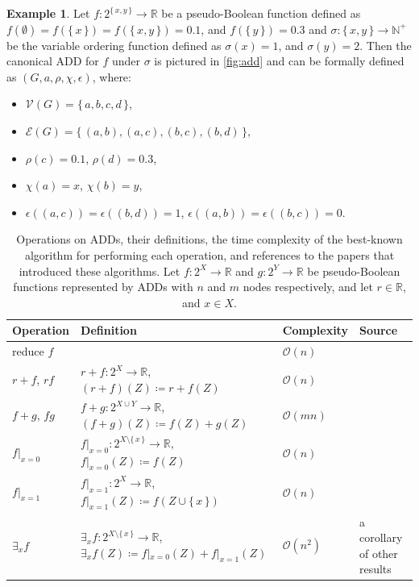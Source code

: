 \documentclass{article}
\theoremstyle{definition}
\newtheorem{example}{Example}
\theoremstyle{remark}
\begin{document}
\begin{example} \label{example:add}
  Let $f\colon 2^{\{\,x, y\,\}} \to \mathbb{R}$ be a pseudo-Boolean function
  defined as $f(\emptyset) = f(\{\,x\,\}) = f(\{\,x, y\,\}) = 0.1$, and
  $f(\{\,y\,\}) = 0.3$ and $\sigma\colon \{\,x, y\,\} \to \mathbb{N}^+$ be
  the variable ordering function defined as $\sigma(x) = 1$, and $\sigma(y) =
  2$. Then the canonical ADD for $f$ under $\sigma$ is pictured in
  \cref{fig:add} and can be formally defined as $(G, a, \rho, \chi, \epsilon)$,
  where:
  \begin{itemize}
  \item $\mathcal{V}(G) = \{\,a, b, c, d\,\}$,
  \item $\mathcal{E}(G) = \{\,(a, b), (a, c), (b, c), (b, d)\,\}$,
  \item $\rho(c) = 0.1$, $\rho(d) = 0.3$,
  \item $\chi(a) = x$, $\chi(b) = y$,
  \item $\epsilon((a, c)) = \epsilon((b, d)) = 1$, $\epsilon((a, b)) =
    \epsilon((b, c)) = 0$.
  \end{itemize}
\end{example}

\begin{table}
  \centering
  \caption{Operations on ADDs, their definitions, the time complexity of the
    best-known algorithm for performing each operation, and references to the
    papers that introduced these algorithms. Let $f\colon 2^X \to \mathbb{R}$
    and $g\colon 2^Y \to \mathbb{R}$ be pseudo-Boolean functions represented by
    ADDs with $n$ and $m$ nodes respectively, and let $r \in \mathbb{R}$, and $x
    \in X$.}
  \label{tbl:complexity}
  \begin{tabular}{llll}
    \toprule
    Operation & Definition & Complexity & Source \\
    \midrule
    reduce $f$ & & $\mathcal{O}(n)$ & \cite{somenzi1998cudd} \\
    $r+f$, $rf$ & $r+f\colon 2^X \to \mathbb{R}$, $(r+f)(Z) \coloneqq r+f(Z)$ & $\mathcal{O}(n)$ & \cite{DBLP:journals/tc/Bryant86} \\
    $f+g$, $fg$ & $f+g\colon 2^{X \cup Y} \to \mathbb{R}$, $(f+g)(Z) \coloneqq f(Z)+g(Z)$ & $\mathcal{O}(mn)$ & \cite{DBLP:journals/tc/Bryant86} \\
    $f|_{x=0}$ & $f|_{x=0}\colon 2^{X \setminus \{\,x\,\}} \to \mathbb{R}$, $f|_{x=0}(Z) \coloneqq f(Z)$ & $\mathcal{O}(n)$ & \cite{DBLP:journals/tc/Bryant86} \\
    $f|_{x=1}$ & $f|_{x=1}\colon 2^X \to \mathbb{R}$, $f|_{x=1}(Z) \coloneqq f(Z \cup \{\,x\,\})$ & $\mathcal{O}(n)$ & \cite{DBLP:journals/tc/Bryant86} \\
    $\exists_xf$ & $\exists_xf\colon 2^{X \setminus \{\,x\,\}} \to \mathbb{R}$, $\exists_xf(Z) \coloneqq f|_{x=0}(Z) + f|_{x=1}(Z)$ & $\mathcal{O}(n^2)$ & a corollary of other results \\
    \bottomrule
  \end{tabular}
\end{table}
\end{document}
